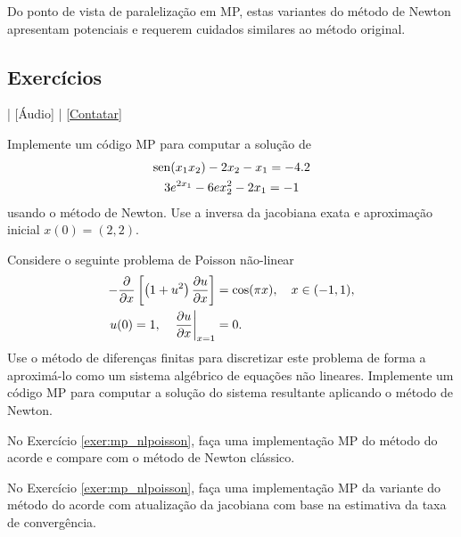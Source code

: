 Do ponto de vista de paralelização em MP, estas variantes do método de Newton apresentam potenciais e requerem  cuidados similares ao método original.

\subsection*{Exercícios}

\begin{flushright}
  [Vídeo] | [Áudio] | \href{https://phkonzen.github.io/notas/contato.html}{[Contatar]}
\end{flushright}

\begin{exer}
  Implemente um código MP para computar a solução de
  \begin{gather}
    \operatorname{sen}(x_1x_2) - 2x_2 - x_1 = -4.2\\
    3e^{2x_1} - 6ex_2^2 - 2x_1 = -1
  \end{gather}
  usando o método de Newton. Use a inversa da jacobiana exata e aproximação inicial $x(0)=(2,2)$.
\end{exer}

\begin{exer}\label{exer:mp_nlpoisson}
  Considere o seguinte problema de Poisson não-linear
  \begin{align}
    -\frac{\partial}{\partial x}\left[\left(1+u^2\right)\frac{\partial u}{\partial x}\right] &= \cos(\pi x),\quad x\in (-1, 1),\\
    u(0) = 1,\quad \left.\frac{\partial u}{\partial x}\right|_{x=1} &= 0.
  \end{align}
  Use o método de diferenças finitas para discretizar este problema de forma a aproximá-lo como um sistema algébrico de equações não lineares. Implemente um código MP para computar a solução do sistema resultante aplicando o método de Newton.
\end{exer}

\begin{exer}
  No Exercício \ref{exer:mp_nlpoisson}, faça uma implementação MP do método do acorde e compare com o método de Newton clássico. 
\end{exer}

\begin{exer}
  No Exercício \ref{exer:mp_nlpoisson}, faça uma implementação MP da variante do método do acorde com atualização da jacobiana com base na estimativa da taxa de convergência.
\end{exer}

